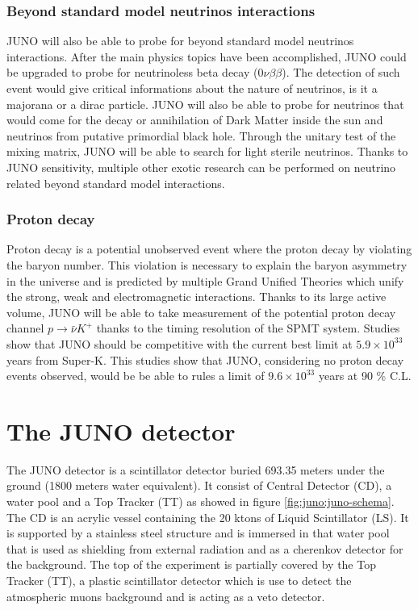 \documentclass[../main.tex]{subfiles}
\begin{document}
\subsubsection{Beyond standard model neutrinos interactions}

JUNO will also be able to probe for beyond standard model neutrinos interactions. After the main physics topics have been accomplished, JUNO could be upgraded to probe for neutrinoless beta decay ($0\nu\beta\beta$). The detection of such event would give critical informations about the nature of neutrinos, is it a majorana or a dirac particle. JUNO will also be able to probe for neutrinos that would come for the decay or annihilation of Dark Matter inside the sun and neutrinos from putative primordial black hole.
Through the unitary test of the mixing matrix, JUNO will be able to search for light sterile neutrinos.
Thanks to JUNO sensitivity, multiple other exotic research can be performed on neutrino related beyond standard model interactions.

\subsubsection{Proton decay}

Proton decay is a potential unobserved event where the proton decay by violating the baryon number. This violation is necessary to explain the baryon asymmetry in the universe and is predicted by multiple Grand Unified Theories which unify the  strong, weak and electromagnetic interactions.
Thanks to its large active volume, JUNO will be able to take measurement of the potential proton decay channel $p \rightarrow \bar{\nu}K^+$ \cite{juno_collaboration_juno_2023} thanks to the timing resolution of the SPMT system. Studies show that JUNO should be competitive with the current best limit at $5.9 \times 10^{33}$ years from Super-K. This studies show that JUNO, considering no proton decay events observed, would be be able to rules a limit of $9.6 \times 10^{33}$ years at 90 \% C.L.


\section{The JUNO detector}
\label{sec:juno:juno_detector}

The JUNO detector is a scintillator detector buried 693.35 meters under the ground (1800 meters water equivalent). It consist of Central Detector (CD), a water pool and a Top Tracker (TT) as showed in figure \ref{fig:juno:juno-schema}.
The CD is an acrylic vessel containing the 20 ktons of Liquid Scintillator (LS). It is supported by a stainless steel structure and is immersed in that water pool that is used as shielding from external radiation and as a cherenkov detector for the background. The top of the experiment is partially covered by the Top Tracker (TT), a plastic scintillator detector which is use to detect the atmospheric muons background and is acting as a veto detector.
\end{document}
